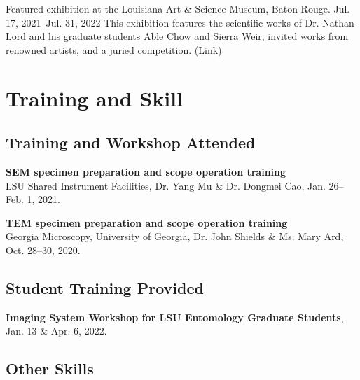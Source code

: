 \documentclass{article}
\newcommand{\hindent}{\hangindent=10pt}
\begin{document}
{Featured exhibition at the Louisiana Art \& Science Museum, Baton Rouge.} 
{Jul. 17, 2021--Jul. 31, 2022}
{This exhibition features the scientific works of Dr. Nathan Lord and his graduate students Able Chow and Sierra Weir, invited works from renowned artists, and a juried competition. \href{https://www.exploreiridescence.com/}{(Link)}}

\section{Training and Skill}
\subsection{Training and Workshop Attended}
\newcommand{\train}[4]{
    \noindent
    \hindent
    \textbf{#1}\\ %
    {#2}, %
    {#3}, %
    \small{#4}. %
    \par\normalsize
}

\train{SEM specimen preparation and scope operation training}
{LSU Shared Instrument Facilities}
{Dr. Yang Mu \& Dr. Dongmei Cao}
{Jan. 26--Feb. 1, 2021}

\train{TEM specimen preparation and scope operation training}
{Georgia Microscopy, University of Georgia}
{Dr. John Shields \& Ms. Mary Ard}
{Oct. 28--30, 2020}

\subsection{Student Training Provided}
\textbf{Imaging System Workshop for LSU Entomology Graduate Students}, 
\small{Jan. 13 \& Apr. 6, 2022.}\normalsize

\subsection{Other Skills}
\newcommand{\skills}[2]{
    \noindent
    \begin{minipage}[t]{.50\textwidth}
    \textbf{#1}:
    \end{minipage}
    \begin{minipage}[t]{.45\textwidth}
    {#2}\hfill
    \end{minipage}
    \normalsize \par
}
\end{document}
